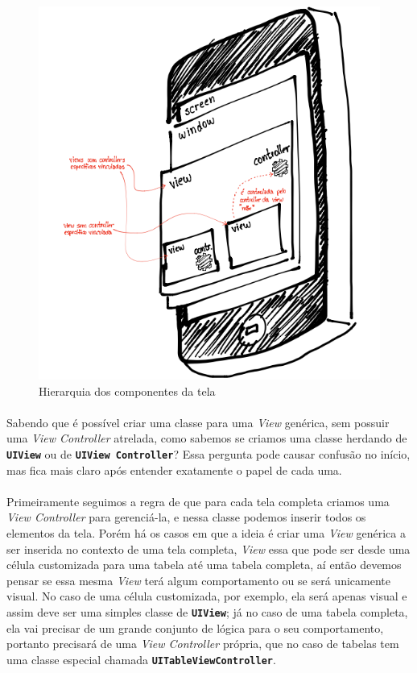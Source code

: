\documentclass[a4paper,12pt,brazil,doubleside]{book}
\begin{document}
\begin{singlespace}
\begin{figure}[H]
  \centering
  \includegraphics[totalheight=0.55\textheight]{figuras/screen_hierarchy.png}
  \caption{Hierarquia dos componentes da tela}
  \label{fig:a}
\end{figure}

\paragraph{}Sabendo que é possível criar uma classe para uma \emph{View} genérica, sem possuir uma \emph{View Controller} atrelada, como sabemos se criamos uma classe herdando de \texttt{\textbf{UIView}} ou de \texttt{\textbf{UIView Controller}}? Essa pergunta pode causar confusão no início, mas fica mais claro após entender exatamente o papel de cada uma.
\paragraph{}Primeiramente seguimos a regra de que para cada tela completa criamos uma \emph{View Controller} para gerenciá-la, e nessa classe podemos inserir todos os elementos da tela. Porém há os casos em que a ideia é criar uma \emph{View} genérica a ser inserida no contexto de uma tela completa, \emph{View} essa que pode ser desde uma célula customizada para uma tabela até uma tabela completa, aí então devemos pensar se essa mesma \emph{View} terá algum comportamento ou se será unicamente visual. No caso de uma célula customizada, por exemplo, ela será apenas visual e assim deve ser uma simples classe de \texttt{\textbf{UIView}}; já no caso de uma tabela completa, ela vai precisar de um grande conjunto de lógica para o seu comportamento, portanto precisará de uma \emph{View Controller} própria, que no caso de tabelas tem uma classe especial chamada \texttt{\textbf{UITableViewController}}.


\end{singlespace}
\end{document}
